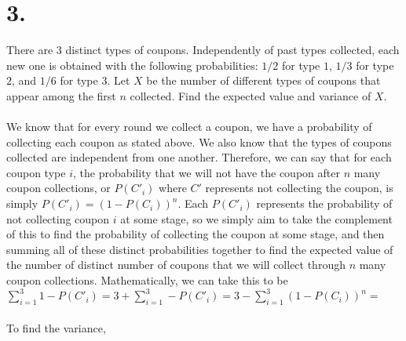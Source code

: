 \documentclass{article}
\begin{document}
\section*{3.}
{\Large 

There are 3 distinct types of coupons. Independently
of past types collected, each new one is obtained with the following probabilities: $1/2$ for type $1$, $1/3$ for type $2$, and $1/6$ for type $3$. Let $X$ be the number of different types of coupons that appear among the first $n$ collected. Find the expected value and variance of $X$. \\ \\
We know that for every round we collect a coupon, we have a probability of collecting each coupon as stated above. We also know that the types of coupons collected are independent from one another. Therefore, we can say that for each coupon type $i$, the probability that we will not have the coupon after $n$ many coupon collections, or $P(C'_i)$ where $C'$ represents not collecting the coupon, is simply $P(C'_i) = (1-P(C_i))^n$. Each $P(C'_i)$ represents the probability of not collecting coupon $i$ at some stage, so we simply aim to take the complement of this to find the probability of collecting the coupon at some stage, and then summing all of these distinct probabilities together to find the expected value of the number of distinct number of coupons that we will collect through $n$ many coupon collections. Mathematically, we can take this to be $\sum_{i = 1}^{3} 1 - P(C'_i) = 3 + \sum_{i=1}^{3} - P(C'_i) = 3 - \sum_{i=1}^{3} (1 - P(C_i))^n = $  \\ \\ 
To find the variance, \\ \\

}
\end{document}

